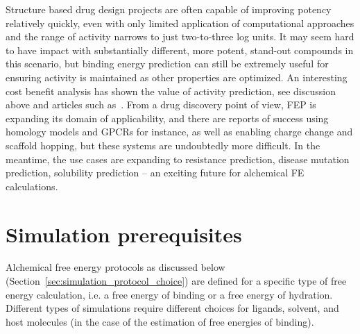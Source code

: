 \documentclass[9pt,bestpractices]{livecoms}
\begin{document}
Structure based drug design projects are often capable of improving potency relatively quickly, even with only limited application of computational approaches and the range of activity narrows to just two-to-three log units. It may seem hard to have impact with substantially different, more potent, stand-out compounds in this scenario, but binding energy prediction can still be extremely useful for ensuring activity is maintained as other properties are optimized. An interesting cost benefit analysis has shown the value of activity prediction, see discussion above and articles such as~\cite{mobley2012perspective}. 
From a drug discovery point of view, FEP is expanding its domain of applicability, and there are reports of success using homology models and GPCRs for instance, as well as enabling charge change and scaffold hopping, but these systems are undoubtedly more difficult.  In the meantime, the use cases are expanding to resistance prediction, disease mutation prediction, solubility prediction – an exciting future for alchemical FE calculations. 

%
%
\section{Simulation prerequisites}
\label{sec:prerequisites}
Alchemical free energy protocols as discussed below (Section~\ref{sec:simulation_protocol_choice}) are defined for a specific type of free energy calculation, i.e. a free energy of binding or a free energy of hydration. Different types of simulations require different choices for ligands, solvent, and host molecules (in the case of the estimation of free energies of binding).
\end{document}
